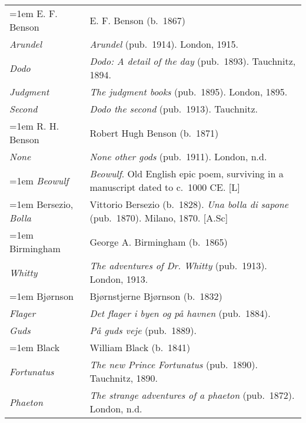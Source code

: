 \begin{xltabular}{\textwidth}{ lQ }
\hangindent=1em  E. F. Benson & E. F. Benson (b.~1867) \\
\hspace{1em}\textit{Arundel} & \textit{Arundel} (pub.~1914). London, 1915. \\
\hspace{1em}\textit{Dodo} & \textit{Dodo: A detail of the day} (pub.~1893). Tauchnitz, 1894.\\
\hspace{1em}\textit{Judgment} & \textit{The judgment books} (pub.~1895). London, 1895. \\
\hspace{1em}\textit{Second} & \textit{Dodo the second} (pub.~1913). Tauchnitz. \\ 

\hangindent=1em  R. H. Benson  & Robert Hugh Benson (b.~1871)\\
\hspace{1em}\textit{None} & \textit{None other gods} (pub.~1911). London, n.d. \\

\hangindent=1em  \textit{Beowulf} & \textit{Beowulf}. Old English epic poem, surviving in a manuscript dated to c.~1000 CE. [L] \\

\hangindent=1em  Bersezio, \textit{Bolla} & Vittorio Bersezio (b.~1828). \textit{Una bolla di sapone} (pub.~1870). Milano, 1870. [A.Sc] \\

\hangindent=1em  Birmingham  & George A. Birmingham (b.~1865)\\
\hspace{1em}\textit{Whitty} & \textit{The adventures of Dr. Whitty} (pub.~1913). London, 1913.\\ %

\hangindent=1em  Bjørnson & Bjørnstjerne Bjørnson (b.~1832) \\
\hspace{1em}\textit{Flager} & \textit{Det flager i byen og på havnen} (pub.~1884).\\
\hspace{1em}\textit{Guds} & \textit{På guds veje} (pub.~1889). \\

\hangindent=1em  Black & William Black (b.~1841) \\
\hspace{1em}\textit{Fortunatus} & \textit{The new Prince Fortunatus} (pub.~1890). Tauchnitz, 1890. \\
\hspace{1em}\textit{Phaeton} & \textit{The strange adventures of a phaeton} (pub.~1872). London, n.d. \\


\end{xltabular}
